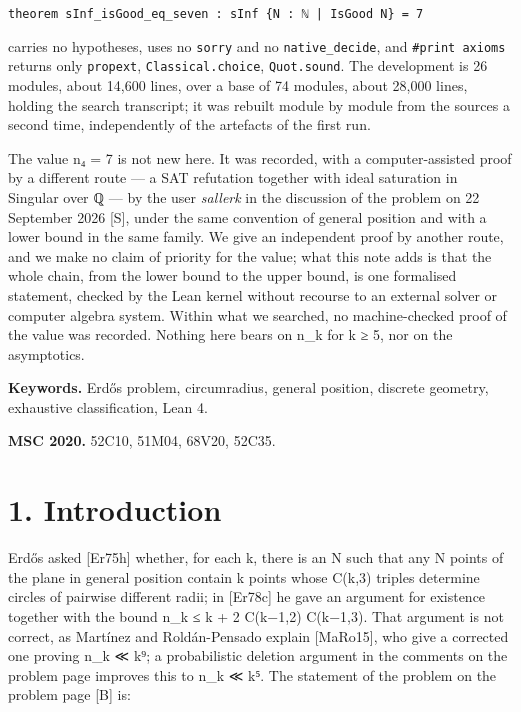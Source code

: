 \documentclass[11pt,a4paper]{article}
\theoremstyle{named}
\begin{document}
\begin{leancode}
\item \texttt{theorem\ \allowbreak{}sInf\_\allowbreak{}isGood\_\allowbreak{}eq\_\allowbreak{}seven\ \allowbreak{}:\ \allowbreak{}sInf\ \allowbreak{}\{N\ \allowbreak{}:\ \allowbreak{}ℕ\ \allowbreak{}|\ \allowbreak{}IsGood\ \allowbreak{}N\}\ \allowbreak{}=\ \allowbreak{}7}
\end{leancode}

carries no hypotheses, uses no \texttt{sorry} and no \texttt{native\_\allowbreak{}decide}, and \texttt{\#print\ \allowbreak{}axioms} returns only \texttt{propext}, \texttt{Classical.\allowbreak{}choice}, \texttt{Quot.\allowbreak{}sound}. The development is 26 modules, about 14,600 lines, over a base of 74 modules, about 28,000 lines, holding the search transcript; it was rebuilt module by module from the sources a second time, independently of the artefacts of the first run.

The value n₄ = 7 is not new here. It was recorded, with a computer-assisted proof by a different route — a SAT refutation together with ideal saturation in Singular over ℚ — by the user \textit{sallerk} in the discussion of the problem on 22 September 2026 [S], under the same convention of general position and with a lower bound in the same family. We give an independent proof by another route, and we make no claim of priority for the value; what this note adds is that the whole chain, from the lower bound to the upper bound, is one formalised statement, checked by the Lean kernel without recourse to an external solver or computer algebra system. Within what we searched, no machine-checked proof of the value was recorded. Nothing here bears on n\_k for k ≥ 5, nor on the asymptotics.

\textbf{Keywords.} Erdős problem, circumradius, general position, discrete geometry, exhaustive classification, Lean 4.

\textbf{MSC 2020.} 52C10, 51M04, 68V20, 52C35.

\section*{1. Introduction}

Erdős asked [Er75h] whether, for each k, there is an N such that any N points of the plane in general position contain k points whose C(k,3) triples determine circles of pairwise different radii; in [Er78c] he gave an argument for existence together with the bound n\_k ≤ k + 2 C(k−1,2) C(k−1,3). That argument is not correct, as Martínez and Roldán-Pensado explain [MaRo15], who give a corrected one proving n\_k ≪ k⁹; a probabilistic deletion argument in the comments on the problem page improves this to n\_k ≪ k⁵. The statement of the problem on the problem page [B] is:
\end{document}
